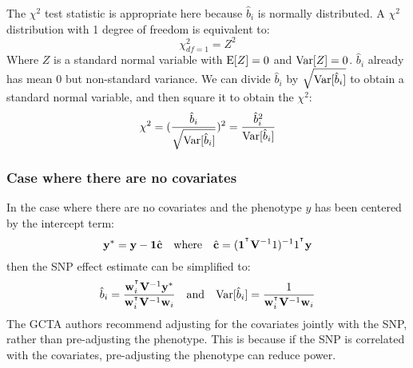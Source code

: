 \documentclass[12pt]{article}
\begin{document}
The $\chi^2$ test statistic is appropriate here because $\hat{b}_i$ is normally distributed.
A $\chi^2$ distribution with 1 degree of freedom is equivalent to:
$$ \chi^2_{df=1} = Z^2$$
Where $Z$ is a standard normal variable with $\mathrm{E}[Z]=0$ and $\mathrm{Var}[Z]=0$. $\hat{b}_i$ already has mean 0 but non-standard variance.
We can divide $\hat{b}_i$ by $\sqrt{\mathrm{Var}[\hat{b}_i]}$ to obtain a standard normal variable, and then square it to obtain the $\chi^2$:
$$ \chi^2 = (\frac{\hat{b}_i}{\sqrt{\mathrm{Var}[\hat{b}_i]}})^2 = \frac{\hat{b}_i^2}{\mathrm{Var}[\hat{b}_i]} $$

\subsubsection{Case where there are no covariates}
In the case where there are no covariates and the phenotype $y$ has been centered by the intercept term:
\begin{equation*}
    \mathbf{y}^* = \mathbf{y} - \mathbf{1} \hat{\mathbf{c}}
    \quad\mathrm{where}\quad
    \hat{\mathbf{c}} = (\mathbf{1}^{^\intercal} \mathbf{V}^{-1} 1)^{-1} 1^{^\intercal} \mathbf{y}
\end{equation*}
then the SNP effect estimate can be simplified to:
\begin{equation*}
    \hat{b}_i = \frac{\mathbf{w}_i^{^\intercal} \mathbf{V}^{-1} \mathbf{y}^*}{\mathbf{w}_i^{^\intercal} \mathbf{V}^{-1} \mathbf{w}_i}
    \quad\mathrm{and}\quad
    \mathrm{Var}[\hat{b}_i] = \frac{1}{\mathbf{w}_i^{^\intercal} \mathbf{V}^{-1} \mathbf{w}_i}
\end{equation*}
The GCTA authors recommend adjusting for the covariates jointly with the SNP, rather than pre-adjusting the phenotype.
This is because if the SNP is correlated with the covariates, pre-adjusting the phenotype can reduce power.
\end{document}
